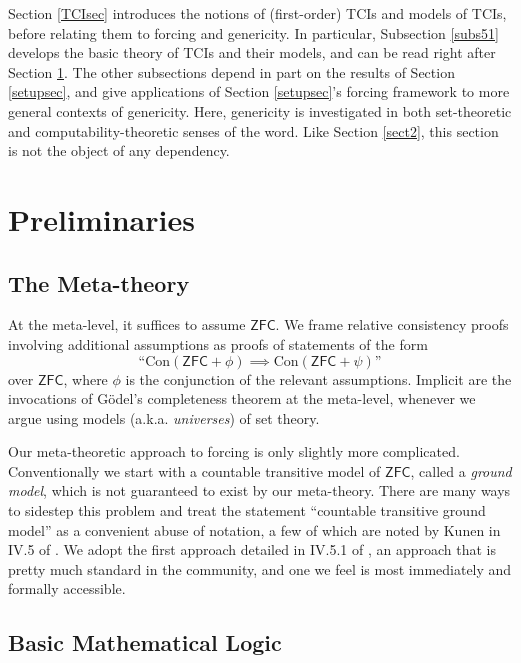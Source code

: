 \documentclass[12pt]{article}
\numberwithin{equation}{section}
\begin{document}
Section \ref{TCIsec} introduces the notions of (first-order) TCIs and models of TCIs, before relating them to forcing and genericity. In particular, Subsection \ref{subs51} develops the basic theory of TCIs and their models, and can be read right after Section \ref{sect15}. The other subsections depend in part on the results of Section \ref{setupsec}, and give applications of Section \ref{setupsec}'s forcing framework to more general contexts of genericity. Here, genericity is investigated in both set-theoretic and computability-theoretic senses of the word. Like Section \ref{sect2}, this section is not the object of any dependency.

\section{Preliminaries}\label{sect15}

\subsection{The Meta-theory}\label{subs21}

At the meta-level, it suffices to assume $\mathsf{ZFC}$. We frame relative consistency proofs involving additional assumptions as proofs of statements of the form $$\text{``}\mathrm{Con}(\mathsf{ZFC} + \phi) \implies \mathrm{Con}(\mathsf{ZFC} + \psi)\text{''}$$ over $\mathsf{ZFC}$, where $\phi$ is the conjunction of the relevant assumptions. Implicit are the invocations of G\"{o}del's completeness theorem at the meta-level, whenever we argue using models (a.k.a. \emph{universes}) of set theory.

Our meta-theoretic approach to forcing is only slightly more complicated. Conventionally we start with a countable transitive model of $\mathsf{ZFC}$, called a \emph{ground model}, which is not guaranteed to exist by our meta-theory. There are many ways to sidestep this problem and treat the statement ``countable transitive ground model'' as a convenient abuse of notation, a few of which are noted by Kunen in IV.5 of \cite{kunen}. We adopt the first approach detailed in IV.5.1 of \cite{kunen}, an approach that is pretty much standard in the community, and one we feel is most immediately and formally accessible.

\subsection{Basic Mathematical Logic}
\end{document}
